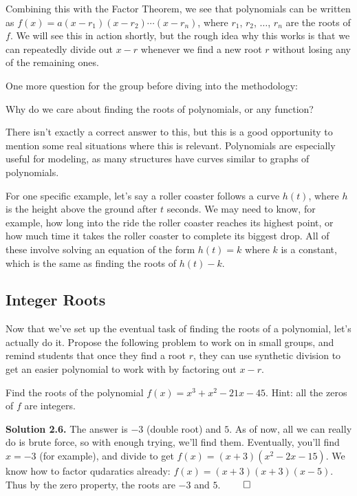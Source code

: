Combining this with the Factor Theorem, we see that polynomials can be written as $f(x) = a(x-r_1)(x-r_2)\cdots (x-r_n)$, where $r_1$, $r_2$, $\dots$, $r_n$ are the roots of $f$. We will see this in action shortly, but the rough idea why this works is that we can repeatedly divide out $x-r$ whenever we find a new root $r$ without losing any of the remaining ones.

One more question for the group before diving into the methodology:

\begin{ques}
    Why do we care about finding the roots of polynomials, or any function?
\end{ques}

There isn't exactly a correct answer to this, but this is a good opportunity to mention some real situations where this is relevant. Polynomials are especially useful for modeling, as many structures have curves similar to graphs of polynomials. 

For one specific example, let's say a roller coaster follows a curve $h(t)$, where $h$ is the height above the ground after $t$ seconds. We may need to know, for example, how long into the ride the roller coaster reaches its highest point, or how much time it takes the roller coaster to complete its biggest drop. All of these involve solving an equation of the form $h(t) = k$ where $k$ is a constant, which is the same as finding the roots of $h(t)-k$.



\subsection{Integer Roots}

Now that we've set up the eventual task of finding the roots of a polynomial, let's actually do it. Propose the following problem to work on in small groups, and remind students that once they find a root $r$, they can use synthetic division to get an easier polynomial to work with by factoring out $x-r$.

\begin{example}
    Find the roots of the polynomial $f(x) = x^3+x^2-21x-45$. Hint: all the zeros of $f$ are integers.
\end{example}

\textbf{Solution 2.6.} The answer is $-3$ (double root) and $5$. As of now, all we can really do is brute force, so with enough trying, we'll find them. Eventually, you'll find $x = -3$ (for example), and divide to get $f(x) = (x+3)(x^2-2x-15)$. We know how to factor qudaratics already: $f(x) = (x+3)(x+3)(x-5)$. Thus by the zero property, the roots are $-3$ and $5$. \hspace*{\fill} $\qed$

